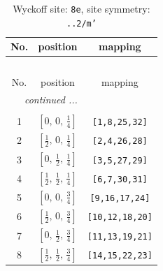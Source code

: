 \documentclass[fleqn,8pt]{jsarticle}
\begin{document}
\renewcommand{\arraystretch}{1.2}
\begin{longtable}{ccc}
\caption{Wyckoff site: {\tt 8e}, site symmetry: {\tt ..2/m'}}
 \\
 \hline \hline
No. & position & mapping \\ \hline \endfirsthead

\multicolumn{2}{l}{\tablename\ \thetable{}} \\
 \hline \hline
No. & position & mapping \\ \hline \endhead

 \hline \hline
\multicolumn{2}{r}{\footnotesize\it continued ...} \\ \endfoot

 \hline \hline
\multicolumn{2}{r}{} \\ \endlastfoot

1 & $\left[ 0,\, 0,\, \frac{1}{4} \right]$ & {\tt [1,8,25,32]} \\ \hline
2 & $\left[ \frac{1}{2},\, 0,\, \frac{1}{4} \right]$ & {\tt [2,4,26,28]} \\ \hline
3 & $\left[ 0,\, \frac{1}{2},\, \frac{1}{4} \right]$ & {\tt [3,5,27,29]} \\ \hline
4 & $\left[ \frac{1}{2},\, \frac{1}{2},\, \frac{1}{4} \right]$ & {\tt [6,7,30,31]} \\ \hline
5 & $\left[ 0,\, 0,\, \frac{3}{4} \right]$ & {\tt [9,16,17,24]} \\ \hline
6 & $\left[ \frac{1}{2},\, 0,\, \frac{3}{4} \right]$ & {\tt [10,12,18,20]} \\ \hline
7 & $\left[ 0,\, \frac{1}{2},\, \frac{3}{4} \right]$ & {\tt [11,13,19,21]} \\ \hline
8 & $\left[ \frac{1}{2},\, \frac{1}{2},\, \frac{3}{4} \right]$ & {\tt [14,15,22,23]} \\
\end{longtable}
\renewcommand{\arraystretch}{1.2}
\end{document}
